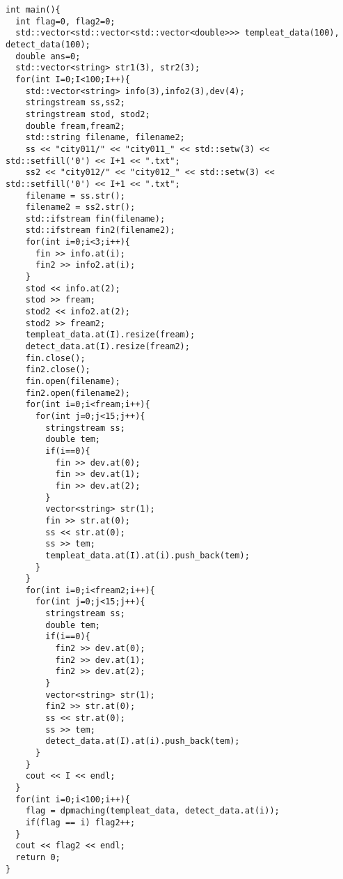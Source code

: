 \documentclass[dvipdfmx]{jsarticle}
\begin{document}
\begin{lstlisting}[caption=作成したプログラム,label=huga]
int main(){
  int flag=0, flag2=0;
  std::vector<std::vector<std::vector<double>>> templeat_data(100), detect_data(100);
  double ans=0;
  std::vector<string> str1(3), str2(3);
  for(int I=0;I<100;I++){
    std::vector<string> info(3),info2(3),dev(4);
    stringstream ss,ss2;
    stringstream stod, stod2;
    double fream,fream2;
    std::string filename, filename2;
    ss << "city011/" << "city011_" << std::setw(3) << std::setfill('0') << I+1 << ".txt";
    ss2 << "city012/" << "city012_" << std::setw(3) << std::setfill('0') << I+1 << ".txt";
    filename = ss.str();
    filename2 = ss2.str();
    std::ifstream fin(filename);
    std::ifstream fin2(filename2);
    for(int i=0;i<3;i++){
      fin >> info.at(i);
      fin2 >> info2.at(i);
    }
    stod << info.at(2);
    stod >> fream;
    stod2 << info2.at(2);
    stod2 >> fream2;
    templeat_data.at(I).resize(fream);
    detect_data.at(I).resize(fream2);
    fin.close();
    fin2.close();
    fin.open(filename);
    fin2.open(filename2);
    for(int i=0;i<fream;i++){
      for(int j=0;j<15;j++){
        stringstream ss;
        double tem;
        if(i==0){
          fin >> dev.at(0);
          fin >> dev.at(1);
          fin >> dev.at(2);
        }
        vector<string> str(1);
        fin >> str.at(0);
        ss << str.at(0);
        ss >> tem;
        templeat_data.at(I).at(i).push_back(tem);
      }
    }
    for(int i=0;i<fream2;i++){
      for(int j=0;j<15;j++){
        stringstream ss;
        double tem;
        if(i==0){
          fin2 >> dev.at(0);
          fin2 >> dev.at(1);
          fin2 >> dev.at(2);
        }
        vector<string> str(1);
        fin2 >> str.at(0);
        ss << str.at(0);
        ss >> tem;
        detect_data.at(I).at(i).push_back(tem);
      }
    }
    cout << I << endl;
  }
  for(int i=0;i<100;i++){
    flag = dpmaching(templeat_data, detect_data.at(i));
    if(flag == i) flag2++;
  }
  cout << flag2 << endl;
  return 0;
}

\end{lstlisting}
\end{document}
